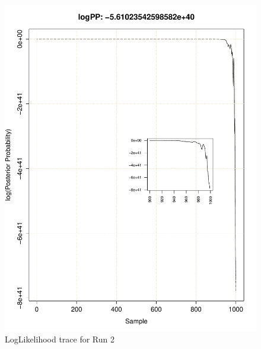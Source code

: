 \documentclass[11pt]{labbook}
\begin{document}
\begin{itemize}
\begin{figure}
        \includegraphics[scale=.65]{FONSE_Plots/2016/June_24/Run2_LogLikeTrace}
        \caption{LogLikelihood trace for Run 2}
        \label{fig:JUN24_LOG_R2}
    \end{figure}
    \begin{figure}
        \centering

\end{figure}
\end{itemize}
\end{document}

